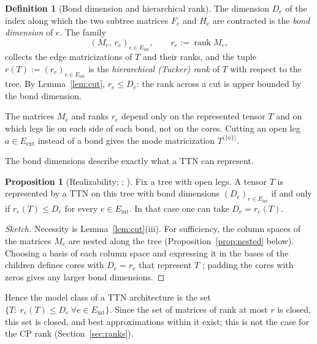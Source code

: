 \documentclass[11pt]{article}
\newcommand{\rank}{\operatorname{rank}}
\newcommand{\Eint}{E_{\mathrm{int}}}
\newcommand{\Eext}{E_{\mathrm{ext}}}
\theoremstyle{definition}
\newtheorem{proposition}[theorem]{Proposition}
\newtheorem{definition}[theorem]{Definition}
\numberwithin{equation}{section}
\begin{document}
\begin{definition}[Bond dimension and hierarchical rank]\label{def:hrank}
The dimension $D_e$ of the index along which the two subtree matrices $F_e$ and $H_e$ are contracted is the \emph{bond dimension} of $e$. The family
\[
(M_e,\,r_e)_{e\in\Eint},\qquad r_e:=\rank M_e,
\]
collects the edge matricizations of $T$ and their ranks, and the tuple $r(T):=(r_e)_{e\in\Eint}$ is the \emph{hierarchical (Tucker) rank} of $T$ with respect to the tree. By Lemma~\ref{lem:cut}, $r_e\le D_e$: the rank across a cut is upper bounded by the bond dimension.
\end{definition}

The matrices $M_e$ and ranks $r_e$ depend only on the represented tensor $T$ and on which legs lie on each side of each bond, not on the cores. Cutting an open leg $a\in\Eext$ instead of a bond gives the mode matricization $T^{\langle\{a\}\rangle}$.

The bond dimensions describe exactly what a TTN can represent.

\begin{proposition}[Realizability; {\citealp{grasedyck2011introduction}}; {\citealp[Proposition~B.1]{furman2026benign}}]\label{prop:realizability}
Fix a tree with open legs. A tensor $T$ is represented by a TTN on this tree with bond dimensions $(D_e)_{e\in\Eint}$ if and only if $r_e(T)\le D_e$ for every $e\in\Eint$. In that case one can take $D_e=r_e(T)$.
\end{proposition}

\begin{proof}[Sketch]
Necessity is Lemma~\ref{lem:cut}(iii). For sufficiency, the column spaces of the matrices $M_e$ are nested along the tree (Proposition~\ref{prop:nested} below). Choosing a basis of each column space and expressing it in the bases of the children defines cores with $D_e=r_e$ that represent $T$ \citep[Proposition~B.1]{furman2026benign}; padding the cores with zeros gives any larger bond dimensions.
\end{proof}

Hence the model class of a TTN architecture is the set $\{T:\ r_e(T)\le D_e\ \forall e\in\Eint\}$. Since the set of matrices of rank at most $r$ is closed, this set is closed, and best approximations within it exist; this is not the case for the CP rank (Section~\ref{sec:ranks}).
\end{document}
